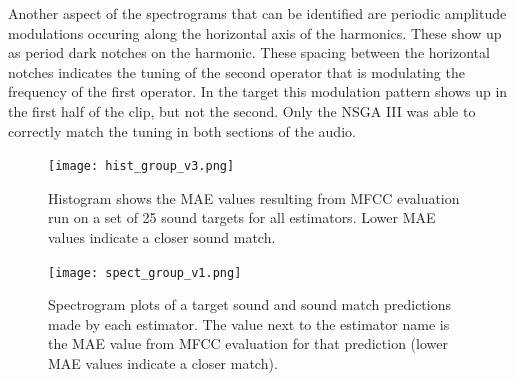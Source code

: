 Another aspect of the spectrograms that can be identified are periodic amplitude modulations occuring along the horizontal axis of the harmonics. These show up as period dark notches on the harmonic. These spacing between the horizontal notches indicates the tuning of the second operator that is modulating the frequency of the first operator. In the target this modulation pattern shows up in the first half of the clip, but not the second. Only the NSGA III was able to correctly match the tuning in both sections of the audio. 


\begin{figure}[t]
\begin{center}
\texttt{[image: hist\_group\_v3.png]}
\caption{Histogram shows the MAE values resulting from MFCC evaluation run on a set of 25 sound targets for all estimators. Lower MAE values indicate a closer sound match.}
\label{fig:group_hist}
\end{center}
\end{figure}

\begin{figure}[t]
\begin{center}
\texttt{[image: spect\_group\_v1.png]}
\caption{Spectrogram plots of a target sound and sound match predictions made by each estimator. The value next to the estimator name is the MAE value from MFCC evaluation for that prediction (lower MAE values indicate a closer match).}
\label{fig:group_spect}
\end{center}
\end{figure}



